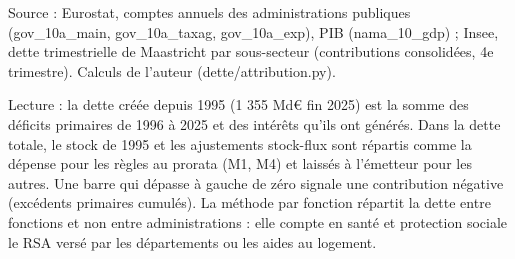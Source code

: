 Source : Eurostat, comptes annuels des administrations publiques (gov\_10a\_main, gov\_10a\_taxag, gov\_10a\_exp), PIB (nama\_10\_gdp) ; Insee, dette trimestrielle de Maastricht par sous-secteur (contributions consolidées, 4e trimestre). Calculs de l'auteur (dette/attribution.py).\par Lecture : la dette créée depuis 1995 (1 355 Md\euro{} fin 2025) est la somme des déficits primaires de 1996 à 2025 et des intérêts qu'ils ont générés. Dans la dette totale, le stock de 1995 et les ajustements stock-flux sont répartis comme la dépense pour les règles au prorata (M1, M4) et laissés à l'émetteur pour les autres. Une barre qui dépasse à gauche de zéro signale une contribution négative (excédents primaires cumulés). La méthode par fonction répartit la dette entre fonctions et non entre administrations : elle compte en santé et protection sociale le RSA versé par les départements ou les aides au logement.
